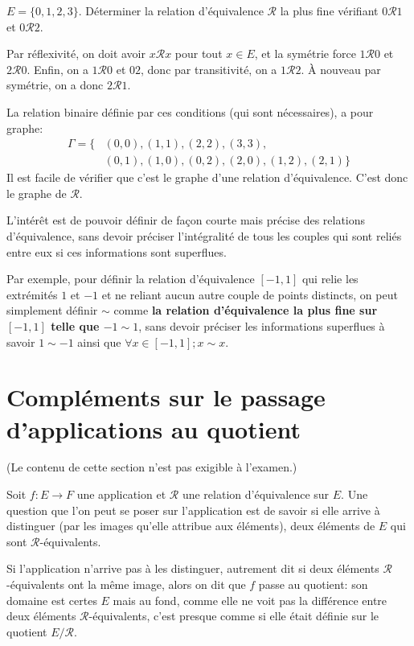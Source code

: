 \begin{exercice}
$E=\{0,1,2,3\}$. Déterminer  la relation d'équivalence $\mathcal R$ la plus fine vérifiant $0\mathcal R 1$ et $0\mathcal R 2$.
\end{exercice}
\begin{red}
Par réflexivité, on doit avoir $x\mathcal R x$ pour tout $x\in E$, et la symétrie force $1\mathcal R 0$ et $2\mathcal R 0$. Enfin, on a $1\mathcal R 0$ et $0\mathcal 2$, donc par transitivité, on a $1 \mathcal R 2$.  À nouveau par symétrie, on a donc $2 \mathcal R 1$. 

La relation binaire définie par ces conditions (qui sont nécessaires), a pour graphe:
\begin{align*}
\Gamma= \big\{ & (0,0), (1,1), (2,2),(3,3),\\
&  (0,1), (1,0),  (0,2), (2,0),  (1,2), (2,1) \big\}
 \end{align*}
 Il est facile de vérifier que c'est le graphe d'une relation d'équivalence. C'est donc le graphe de $\mathcal R$.
\end{red}

\begin{mdframed}[linewidth=2]
L'intérêt est de pouvoir définir de façon courte mais précise des relations d'équivalence, sans devoir préciser l'intégralité de tous les couples qui sont reliés entre eux si ces informations sont superflues.

Par exemple,  pour définir la relation d'équivalence $[-1,1]$ qui relie les extrémités $1$ et $-1$ et ne reliant aucun autre couple de points distincts, on peut simplement définir $\sim$ comme \textbf{\og la relation d'équivalence la plus fine sur $[-1,1]$ telle que  $-1\sim  1$\fg}, sans devoir  préciser les informations superflues à savoir $1\sim -1$ ainsi que $\forall x\in [-1,1]; x\sim x$.
\end{mdframed}












\section{Compléments sur le passage d'applications au quotient}

(Le contenu de cette section n'est pas exigible à l'examen.)

\begin{mdframed}[linewidth=2]
Soit $f : E\to F$ une application et $\mathcal R$ une relation d'équivalence sur $E$. Une question que l'on peut se poser sur l'application est de savoir si elle arrive à distinguer (par les images qu'elle attribue aux éléments), deux éléments de $E$ qui sont $\mathcal R$-équivalents.

Si l'application n'arrive pas à les distinguer, autrement dit si deux éléments $\mathcal R$-équivalents ont la même image, alors on dit que $f$ \og passe au quotient\fg : son domaine est certes $E$ mais au fond, comme elle ne voit pas la différence entre deux éléments $\mathcal R$-équivalents, c'est presque comme si elle était définie sur le quotient $E/\mathcal R$.
\end{mdframed}

